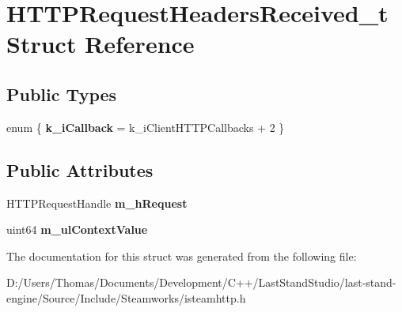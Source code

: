 \hypertarget{structHTTPRequestHeadersReceived__t}{}\section{H\+T\+T\+P\+Request\+Headers\+Received\+\_\+t Struct Reference}
\label{structHTTPRequestHeadersReceived__t}
\subsection*{Public Types}
\begin{DoxyCompactItemize}
\item 
\hypertarget{structHTTPRequestHeadersReceived__t_a3b519f8888c9fda487dccef7ed668a52}{}enum \{ {\bfseries k\+\_\+i\+Callback} = k\+\_\+i\+Client\+H\+T\+T\+P\+Callbacks + 2
 \}\label{structHTTPRequestHeadersReceived__t_a3b519f8888c9fda487dccef7ed668a52}

\end{DoxyCompactItemize}
\subsection*{Public Attributes}
\begin{DoxyCompactItemize}
\item 
\hypertarget{structHTTPRequestHeadersReceived__t_a93f8fb83cc7d4ba43d23e205c463b1ae}{}H\+T\+T\+P\+Request\+Handle {\bfseries m\+\_\+h\+Request}\label{structHTTPRequestHeadersReceived__t_a93f8fb83cc7d4ba43d23e205c463b1ae}

\item 
\hypertarget{structHTTPRequestHeadersReceived__t_a29092d5ae7e32a5117be434f363ba9a3}{}uint64 {\bfseries m\+\_\+ul\+Context\+Value}\label{structHTTPRequestHeadersReceived__t_a29092d5ae7e32a5117be434f363ba9a3}

\end{DoxyCompactItemize}


The documentation for this struct was generated from the following file\+:\begin{DoxyCompactItemize}
\item 
D\+:/\+Users/\+Thomas/\+Documents/\+Development/\+C++/\+Last\+Stand\+Studio/last-\/stand-\/engine/\+Source/\+Include/\+Steamworks/isteamhttp.\+h\end{DoxyCompactItemize}
